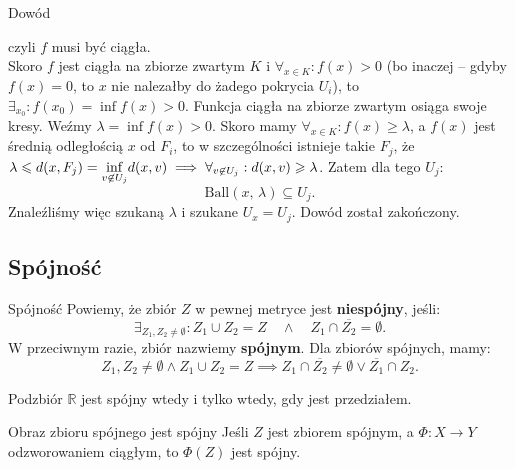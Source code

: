 \documentclass{article}
\numberwithin{defi}{section}
\numberwithin{defi}{section}
\newcommand{\R}{\mathbb{R}}
\newcommand{\se}{\subseteq}
\providecommand{\ol}{\overline}
\renewcommand{\geq}{\geqslant}
\renewcommand{\leq}{\leqslant}
\newcommand{\ball}[2]{\text{Ball}(#1, \, #2)}
\begin{document}
\begin{dow}{Dowód}
\begin{itemize}
\begin{equation*}
        \end{equation*} czyli $f$ musi być ciągła. \\
        Skoro $f$ jest ciągła na zbiorze zwartym $K$ i $\forall_{x \in K}: f(x) > 0$ (bo inaczej -- gdyby $f(x) = 0$, to $x$ nie nalezałby do żadego pokrycia $U_i$), to $\exists_{x_0}: f(x_0) = \inf f(x) >0$. Funkcja ciągła na zbiorze zwartym osiąga swoje kresy. Weźmy $\lambda = \inf f(x) > 0$. Skoro mamy $\forall_{x \in K}: f(x) \geq \lambda$, a $f(x)$ jest średnią odległością $x$ od $F_i$, to w szczególności istnieje takie $F_j$, że $\lambda \leq d(x, F_j) = \mathlarger{\inf}_{v \not \in U_j}d(x, v)  \implies \forall_{v \not \in U_j}: d(x, v) \geq \lambda$.  Zatem dla tego $U_j$:\begin{equation*}
            \ball{x}{\lambda} \se U_j.
        \end{equation*} Znaleźliśmy więc szukaną $\lambda$ i szukane $U_x = U_j$. Dowód został zakończony.
    \end{itemize}
\end{dow}


\subsection{Spójność}

\begin{defr}{Spójność}
    Powiemy, że zbiór $Z$ w pewnej metryce jest \textbf{niespójny}, jeśli:\begin{equation}
        \exists_{Z_1, Z_2 \neq \emptyset}: Z_1 \cup Z_2 = Z \quad \wedge \quad  Z_1 \cap \ol{Z_2} = \emptyset.
    \end{equation} W przeciwnym razie, zbiór nazwiemy \textbf{spójnym}. Dla zbiorów spójnych, mamy: \begin{equation*}
        Z_1, Z_2 \neq \emptyset \wedge Z_1 \cup Z_2 = Z \implies Z_1 \cap \ol{Z_2} \neq \emptyset \vee \ol{Z_1} \cap Z_2.
    \end{equation*}
\end{defr}

\begin{obs}{}
    Podzbiór $\R$ jest spójny wtedy i tylko wtedy, gdy jest przedziałem.
\end{obs}



\begin{twier}{Obraz zbioru spójnego jest spójny}
    Jeśli $Z$ jest zbiorem spójnym, a $\Phi: X \to Y$ odzworowaniem ciągłym, to $\Phi(Z)$ jest spójny.
\end{twier}
\end{document}
